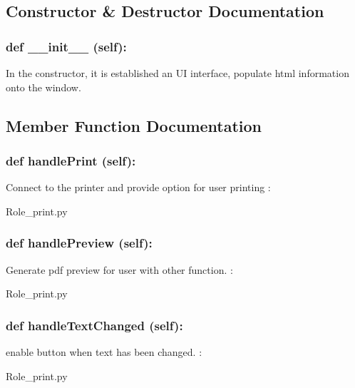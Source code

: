 \subsection{Constructor \& Destructor Documentation}
\hypertarget{class_poly_aa3def076b74bed67904976ad4f9fe9b1}{
\subsubsection[{def __init__ (self):}]{\setlength{\rightskip}{0pt plus 5cm}def {\_\_init\_\_} (self): 
}}
In the constructor, it is established an UI interface, populate html information onto the window. 

\subsection{Member Function Documentation}
\hypertarget{class_poly_a14a7ad77ce612b0c54f531d307ee4b39}{
\subsubsection[{def handlePrint (self):}]{\setlength{\rightskip}{0pt plus 5cm}def {handlePrint} (self):}}\label{class_poly_a14a7ad77ce612b0c54f531d307ee4b39}
Connect to the printer and provide option for user printing
:\begin{DoxyCompactItemize}
\item 
Role\_print.\-py\end{DoxyCompactItemize}

\hypertarget{class_poly_a14a7ad77ce612b0c54f531d307ee4b39}{
\subsubsection[{def handlePreview (self):}]{\setlength{\rightskip}{0pt plus 5cm}def {handlePreview} (self):}}\label{class_poly_a14a7ad77ce612b0c54f531d307ee4b39}
Generate pdf preview for user with other function.
:\begin{DoxyCompactItemize}
\item 
Role\_print.\-py\end{DoxyCompactItemize}

\hypertarget{class_poly_a14a7ad77ce612b0c54f531d307ee4b39}{
\subsubsection[{def handleTextChanged (self):}]{\setlength{\rightskip}{0pt plus 5cm}def {handleTextChanged} (self):}}\label{class_poly_a14a7ad77ce612b0c54f531d307ee4b39}
enable button when text has been changed.
:\begin{DoxyCompactItemize}
\item 
Role\_print.\-py\end{DoxyCompactItemize}

